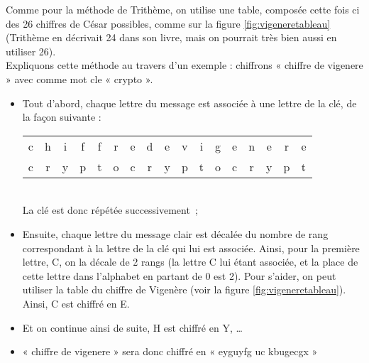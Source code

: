 Comme pour la méthode de Trithème, on utilise une table, composée
cette fois ci des 26 chiffres de César possibles, comme sur la figure
\ref{fig:vigeneretableau} (Trithème en décrivait 24 dans son livre,
mais on pourrait très bien aussi en utiliser 26). \\

Expliquons cette méthode au travers d'un exemple : chiffrons « chiffre
de vigenere » avec comme mot cle « crypto ».
\begin{itemize}
  \item Tout d'abord, chaque lettre du message est associée à une
    lettre de la clé, de la façon suivante : \\
    \begin{tabular}{c@{}c@{}c@{}c@{}c@{}c@{}cc@{}cc@{}c@{}c@{}c@{}c@{}c@{}c@{}c}
      c & h & i & f & f & r & e &
      d & e &
      v & i & g & e & n & e & r & e \\

      c & r & y & p & t & o & c & 
      r & y & 
      p & t & o & c & r & y & p & t \\
    \end{tabular}\\
    La clé est donc répétée successivement~;
  \item Ensuite, chaque lettre du message clair est décalée du nombre
    de rang correspondant à la lettre de la clé qui lui est
    associée. Ainsi, pour la première lettre, C, on la décale de 2
    rangs (la lettre C lui étant associée, et la place de cette lettre
    dans l'alphabet en partant de 0 est 2). Pour s'aider, on peut
    utiliser la table du chiffre de Vigenère (voir la figure
    \ref{fig:vigeneretableau}). \\
    Ainsi, C est chiffré en E.
  \item Et on continue ainsi de suite, H est chiffré en Y, \dots
  \item « chiffre de vigenere » sera donc chiffré en « eyguyfg uc
    kbugecgx »
\end{itemize}

